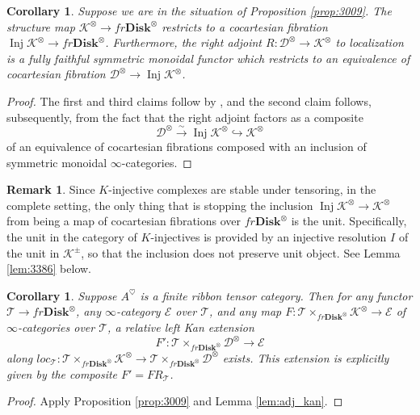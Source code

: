 \documentclass[reqno]{amsart}
\newtheorem{corollary}[lemma]{Corollary}
\theoremstyle{definition}
\newtheorem{remark}[lemma]{Remark}
\newcommand{\msc}[1]{\mathscr{#1}}
\newcommand{\opn}[1]{\operatorname{#1}}
\newcommand{\ot}{\otimes}
\newcommand{\Disk}{\mathbf{Disk}}
\renewcommand{\1}{\mathbf{1}}
\begin{document}
\begin{corollary}\label{cor:3075}
Suppose we are in the situation of Proposition \ref{prop:3009}. The structure map $\msc{K}^{\ot}\to fr\Disk^{\ot}$ restricts to a cocartesian fibration $\opn{Inj}\msc{K}^{\ot}\to fr\Disk^{\ot}$. Furthermore, the right adjoint $R:\msc{D}^{\ot}\to \msc{K}^{\ot}$ to localization is a fully faithful symmetric monoidal functor which restricts to an equivalence of cocartesian fibration $\msc{D}^{\ot}\to \opn{Inj}\msc{K}^{\ot}$.
\end{corollary}

\begin{proof}
The first and third claims follow by \cite[\href{https://kerodon.net/tag/028A}{028A}]{kerodon}, and the second claim follows, subsequently, from the fact that the right adjoint factors as a composite
\[
\msc{D}^{\ot}\overset{\sim}\to \opn{Inj}\msc{K}^{\ot}\hookrightarrow \msc{K}^{\ot}
\]
of an equivalence of cocartesian fibrations composed with an inclusion of symmetric monoidal $\infty$-categories.
\end{proof}

\begin{remark}
Since $K$-injective complexes are stable under tensoring, in the complete setting, the only thing that is stopping the inclusion $\opn{Inj}\msc{K}^{\ot}\to \msc{K}^{\ot}$ from being a map of cocartesian fibrations over $fr\Disk^{\ot}$ is the unit.  Specifically, the unit in the category of $K$-injectives is provided by an injective resolution $I$ of the unit in $\msc{K}^{\pm}$, so that the inclusion does not preserve unit object. See Lemma \ref{lem:3386} below.
\end{remark}

\begin{corollary}\label{cor:der_relkan}
Suppose $A^{\heartsuit}$ is a finite ribbon tensor category. Then for any functor $\msc{T}\to fr\Disk^{\ot}$, any $\infty$-category $\msc{E}$ over $\msc{T}$, and any map $F:\msc{T}\times_{fr\Disk^{\ot}}\msc{K}^{\ot}\to \msc{E}$ of $\infty$-categories over $\msc{T}$, a relative left Kan extension
\[
F':\msc{T}\times_{fr\Disk^{\ot}}\msc{D}^{\ot}\to \msc{E}
\]
along $loc_{\msc{T}}:\msc{T}\times_{fr\Disk^{\ot}}\msc{K}^{\ot}\to \msc{T}\times_{fr\Disk^{\ot}}\msc{D}^{\ot}$ exists.  This extension is explicitly given by the composite $F'=FR_{\msc{T}}$.
\end{corollary}

\begin{proof}
Apply Proposition \ref{prop:3009} and Lemma \ref{lem:adj_kan}.
\end{proof}
\end{document}
